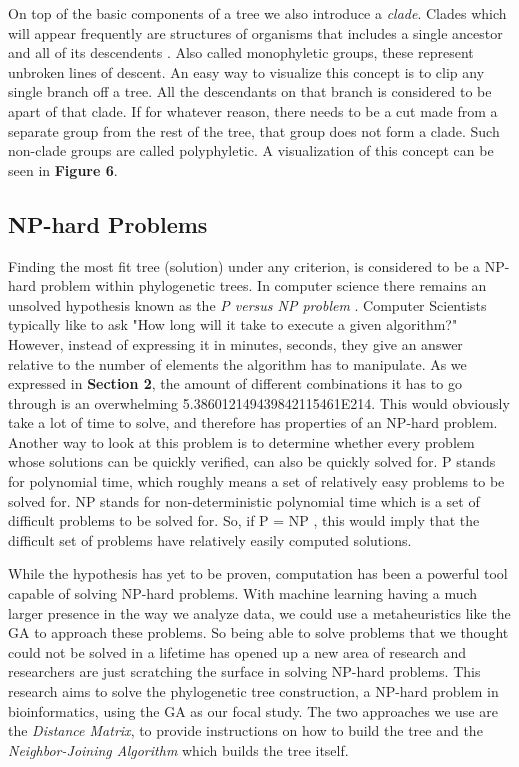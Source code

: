 On top of the basic components of a tree we also introduce a \emph{clade}. Clades which will appear frequently are structures of organisms that includes a single ancestor and all of its descendents \cite{Clade}. Also called monophyletic groups, these represent unbroken lines of descent. An easy way to visualize this concept is to clip any single branch off a tree. All the descendants on that branch is considered to be apart of that clade. If for whatever reason, there needs to be a cut made from a separate group from the rest of the tree, that group does not form a clade. Such non-clade groups are called polyphyletic. A visualization of this concept can be seen in \textbf{Figure 6}. 

\subsection{NP-hard Problems}

Finding the most fit tree (solution) under any criterion, is considered to be a NP-hard problem within phylogenetic trees. 
In computer science there remains an unsolved hypothesis known as the \emph{P versus NP problem} \cite{Hardesty}.
Computer Scientists typically like to ask "How long will it take to execute a given algorithm?"
However, instead of expressing it in minutes, seconds, they give an answer relative to the number of elements the algorithm has to manipulate.
As we expressed in \textbf{Section 2}, the amount of different combinations it has to go through is an overwhelming 5.386012149439842115461E214.
This would obviously take a lot of time to solve, and therefore has properties of an NP-hard problem. 
Another way to look at this problem is to determine whether every problem whose solutions can be quickly verified, can also be quickly solved for. 
P stands for polynomial time, which roughly means a set of relatively easy problems to be solved for. 
NP stands for non-deterministic polynomial time which is a set of difficult problems to be solved for. 
So, if P = NP , this would imply that the difficult set of problems have relatively easily computed solutions.

While the hypothesis has yet to be proven, computation has been a powerful tool capable of solving NP-hard problems. 
With machine learning having a much larger presence in the way we analyze data, we could use a metaheuristics like the GA to approach these problems.
So being able to solve problems that we thought could not be solved in a lifetime has opened up a new area of research and researchers are just scratching the surface in solving  NP-hard problems.   
This research aims to solve the phylogenetic tree construction, a NP-hard problem in bioinformatics, using the GA as our focal study. 
The two approaches we use are the \emph{Distance Matrix}, to provide instructions on how to build the tree and the \emph{Neighbor-Joining Algorithm} which builds the tree itself.  

